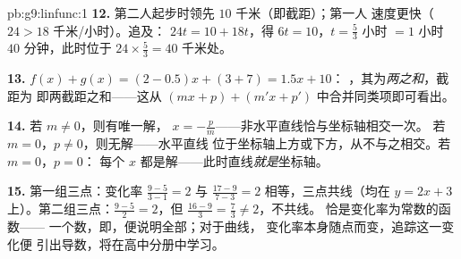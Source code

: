 \begin{solution}{pb:g9:linfunc:1}
\textbf{12.} 第二人起步时领先 $10$ 千米（即截距）；第一人
速度更快（$24 > 18$ 千米/小时）。追及：
$24t = 10 + 18t$，得 $6t = 10$，$t = \frac53$ 小时 $= 1$ 小时 $40$
分钟，此时位于 $24 \times \frac53 = 40$ 千米处。

\textbf{13.} $f(x) + g(x) = (2 - 0.5)x + (3 + 7) = 1.5x + 10$：
，其为\emph{两之和}，截距为
即两截距之和——这从
$(mx + p) + (m'x + p')$ 中合并同类项即可看出。

\textbf{14.} 若 $m \neq 0$，则有唯一解，
$x = -\frac pm$——非水平直线恰与坐标轴相交一次。
若 $m = 0$，$p \neq 0$，则无解——水平直线
位于坐标轴上方或下方，从不与之相交。若 $m = 0$，$p = 0$：
每个 $x$ 都是解——此时直线\emph{就是}坐标轴。

\textbf{15.} 第一组三点：变化率 $\frac{9 - 5}{3 - 1} = 2$ 与
$\frac{17 - 9}{7 - 3} = 2$ 相等，三点共线（均在
$y = 2x + 3$ 上）。第二组三点：$\frac{9-5}{2} = 2$，但
$\frac{16 - 9}{3} = \frac73 \neq 2$，不共线。
恰是变化率为常数的函数——
一个数，即，便说明全部；对于曲线，
变化率本身随点而变，追踪这一变化便
引出导数，将在高中分册中学习。
\end{solution}
